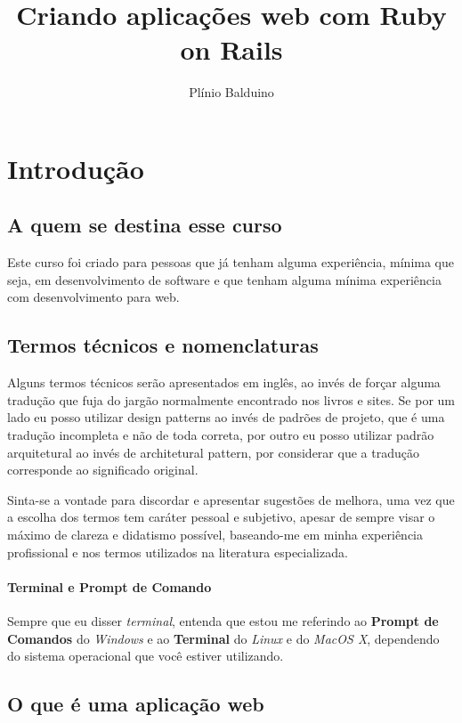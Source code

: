 \documentclass[12pt]{book} %
\title{Criando aplicações web com Ruby on Rails}
\author{Plínio Balduino}
\begin{document}
\maketitle

\tableofcontents

\pagebreak

\chapter{Introdução}

\section{A quem se destina esse curso}

Este curso foi criado para pessoas que já tenham alguma experiência, mínima que seja, em desenvolvimento de software e que tenham alguma mínima experiência com desenvolvimento para web.

\section{Termos técnicos e nomenclaturas}

Alguns termos técnicos serão apresentados em inglês, ao invés de forçar alguma tradução que fuja do jargão normalmente encontrado nos livros e sites. Se por um lado eu posso utilizar design patterns ao invés de padrões de projeto, que é uma tradução incompleta e não de toda correta, por outro eu posso utilizar padrão arquitetural ao invés de architetural pattern, por considerar que a tradução corresponde ao significado original.

Sinta-se a vontade para discordar e apresentar sugestões de melhora, uma vez que a escolha dos termos tem caráter pessoal e subjetivo, apesar de sempre visar o máximo de clareza e didatismo possível, baseando-me em minha experiência profissional e nos termos utilizados na literatura especializada.

\subsubsection{Terminal e Prompt de Comando}

Sempre que eu disser \emph{terminal}, entenda que estou me referindo ao \textbf{Prompt de Comandos} do \emph{Windows} e ao \textbf{Terminal} do \emph{Linux} e do \emph{MacOS X}, dependendo do sistema operacional que você estiver utilizando. 

\section{O que é uma aplicação web}
\end{document}
